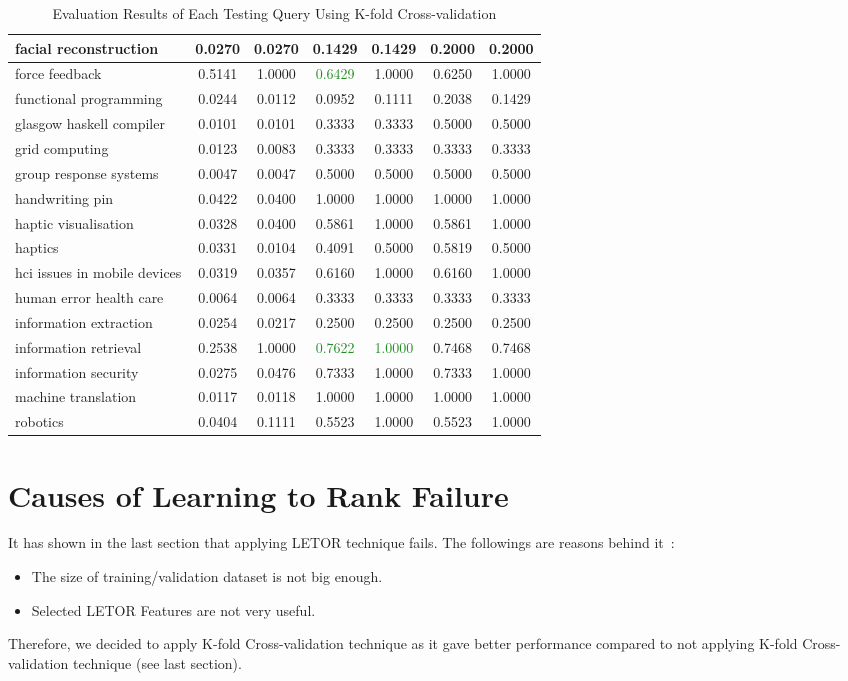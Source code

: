 \begin{table}
{\begin{tabular}{|l|c|c|c|c|c|c|}
\hline facial reconstruction & 0.0270 & 0.0270 & 0.1429 & 0.1429 & 0.2000 & 0.2000 \\
\hline force feedback & 0.5141 & 1.0000 & \textcolor{ForestGreen}{0.6429} & 1.0000 & 0.6250 & 1.0000 \\
\hline functional programming & 0.0244 & 0.0112 & 0.0952 & 0.1111 & 0.2038 & 0.1429 \\
\hline glasgow haskell compiler & 0.0101 & 0.0101 & 0.3333 & 0.3333 & 0.5000 & 0.5000 \\
\hline grid computing & 0.0123 & 0.0083 & 0.3333 & 0.3333 & 0.3333 & 0.3333 \\
\hline group response systems & 0.0047 & 0.0047 & 0.5000 & 0.5000 & 0.5000 & 0.5000 \\
\hline handwriting pin & 0.0422 & 0.0400 & 1.0000 & 1.0000 & 1.0000 & 1.0000 \\
\hline haptic visualisation & 0.0328 & 0.0400 & 0.5861 & 1.0000 & 0.5861 & 1.0000 \\
\hline haptics & 0.0331 & 0.0104 & 0.4091 & 0.5000 & 0.5819 & 0.5000 \\
\hline hci issues in mobile devices & 0.0319 & 0.0357 & 0.6160 & 1.0000 & 0.6160 & 1.0000 \\
\hline human error health care & 0.0064 & 0.0064 & 0.3333 & 0.3333 & 0.3333 & 0.3333 \\
\hline information extraction & 0.0254 & 0.0217 & 0.2500 & 0.2500 & 0.2500 & 0.2500 \\
\hline information retrieval & 0.2538 & 1.0000 & \textcolor{ForestGreen}{0.7622} & \textcolor{ForestGreen}{1.0000} & 0.7468 & 0.7468 \\
\hline information security & 0.0275 & 0.0476 & 0.7333 & 1.0000 & 0.7333 & 1.0000 \\
\hline machine translation & 0.0117 & 0.0118 & 1.0000 & 1.0000 & 1.0000 & 1.0000 \\
\hline robotics & 0.0404 & 0.1111 & 0.5523 & 1.0000 & 0.5523 & 1.0000 \\
\hline
\end{tabular}
}
\caption{Evaluation Results of Each Testing Query Using K-fold Cross-validation} \label{table:kfoldqueryresult}
\end{table}

\section{Causes of Learning to Rank Failure}
It has shown in the last section that applying LETOR technique fails. The followings are reasons behind it~\cite{craig}:
\begin{itemize}
 \item The size of training/validation dataset is not big enough.
 \item Selected LETOR Features are not very useful.
\end{itemize}
Therefore, we decided to apply K-fold Cross-validation technique as it gave better performance compared to not applying K-fold Cross-validation technique
(see last section).
